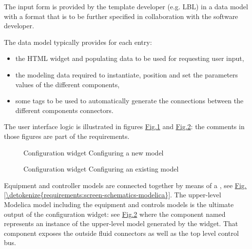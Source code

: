 \documentclass[letterpaper,10pt, openany,english]{sphinxmanual}
\begin{document}
The input form is provided by the template developer (e.g. LBL) in a data model with a format that is to be further specified in collaboration with the software developer.

The data model typically provides for each entry:
\begin{itemize}
\item {} 
the HTML widget and populating data to be used for requesting user input,

\item {} 
the modeling data required to instantiate, position and set the parameters values of the different components,

\item {} 
some tags to be used to automatically generate the connections between the different components connectors.

\end{itemize}

The user interface logic is illustrated in figures \hyperref[\detokenize{requirements:screen-conf-0}]{Fig.\@ \ref{\detokenize{requirements:screen-conf-0}}} and \hyperref[\detokenize{requirements:screen-conf-1}]{Fig.\@ \ref{\detokenize{requirements:screen-conf-1}}}: the comments in those figures are part of the requirements.

\begin{figure}[htbp]
\centering
\capstart

\noindent{}
\caption{Configuration widget \textendash{} Configuring a new model}\label{\detokenize{requirements:screen-conf-0}}\end{figure}

\begin{figure}[htbp]
\centering
\capstart

\noindent{}
\caption{Configuration widget \textendash{} Configuring an existing model}\label{\detokenize{requirements:screen-conf-1}}\end{figure}

Equipment and controller models are connected together by means of a , see \hyperref[\detokenize{requirements:screen-schematics-modelica}]{Fig.\@ \ref{\detokenize{requirements:screen-schematics-modelica}}}. The upper-level Modelica model including the equipment and controls models is the ultimate output of the configuration widget: see \hyperref[\detokenize{requirements:screen-conf-1}]{Fig.\@ \ref{\detokenize{requirements:screen-conf-1}}} where the component named  represents an instance of the upper-level model  generated by the widget. That component exposes the outside fluid connectors as well as the top level control bus.
\end{document}
